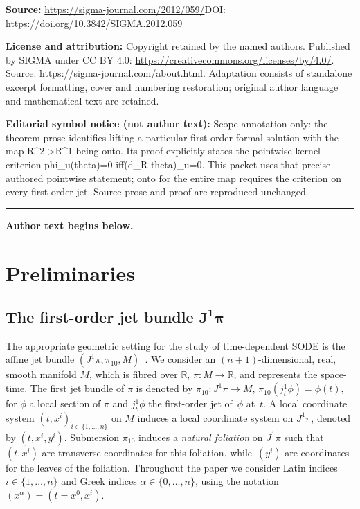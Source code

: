 \documentclass[11pt]{article}
\begin{document}
\noindent\textbf{Source:} \url{https://sigma-journal.com/2012/059/}\quad DOI: \url{https://doi.org/10.3842/SIGMA.2012.059}\par
\noindent\textbf{License and attribution:} Copyright retained by the named authors. Published by SIGMA under CC BY 4.0: \url{https://creativecommons.org/licenses/by/4.0/}. Source: \url{https://sigma-journal.com/about.html}. Adaptation consists of standalone excerpt formatting, cover and numbering restoration; original author language and mathematical text are retained.\par
\noindent\textbf{Editorial symbol notice (not author text):} Scope annotation only: the theorem prose identifies lifting a particular first-order formal solution with the map R\textasciicircum{}2->R\textasciicircum{}1 being onto. Its proof explicitly states the pointwise kernel criterion phi\_u(theta)=\allowbreak{}0 iff(d\_R theta)\_u=\allowbreak{}0. This packet uses that precise authored pointwise statement; onto for the entire map requires the criterion on every first-order jet. Source prose and proof are reproduced unchanged.\par
\medskip\hrule\medskip\noindent\textbf{Author text begins below.}\par
\setcounter{section}{1}
\setcounter{subsection}{0}
\setcounter{subsubsection}{0}
\setcounter{equation}{0}
\section{Preliminaries} \label{sec:prelim}


\subsection[The first-order jet bundle $J^{1}\pi$]{The f\/irst-order jet bundle $\boldsymbol{J^{1}\pi}$} \label{subsec:fn}

The appropriate geometric setting for the study of time-dependent
SODE is the af\/f\/ine jet bundle $(J^{1}\pi,\pi_{10},M)$~\cite{saunders89}.
We consider an $(n+1)$-dimensional, real, smooth manifold $M$, which
is f\/ibred over $\mathbb{R}$, $\pi:M\rightarrow\mathbb{R}$, and represents
the space-time. The f\/irst jet bundle of $\pi$ is denoted by $\pi_{10}:J^{1}\pi\to M$,
$\pi_{10}(j_{t}^{1}\phi)=\phi(t),$ for $\phi$ a local section of
$\pi$ and $j_{t}^{1}\phi$ the f\/irst-order jet of~$\phi$ at~$t$.
A local coordinate system $(t,x^{i})_{i\in \{1,\dots,n\}}$ on $M$
induces a local coordinate system on $J^{1}\pi$, denoted by $(t,x^{i},y^{i})$.
Submersion $\pi_{10}$ induces a \emph{natural foliation} on $J^{1}\pi$
such that~$(t,x^{i})$ are transverse coordinates for this foliation,
while~$(y^{i})$ are coordinates for the leaves of the foliation.
Throughout the paper we consider Latin indices $i\in \{1,\dots,n\}$
and Greek indices $\alpha\in \{0,\dots,n\}$, using the notation~$\left(x^{\alpha}\right)=(t=x^{0},x^{i})$.
\end{document}
